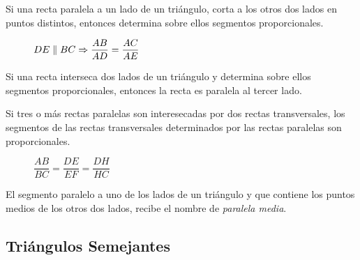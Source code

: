 
\begin{theorem}
    Si una recta paralela a un lado de un triángulo, corta a los otros dos lados en puntos distintos, entonces determina sobre ellos segmentos proporcionales.
    
    \begin{figure}[!h]
        \centering
        
        \caption{$DE \parallel BC \Rightarrow \dfrac{AB}{AD} = \dfrac{AC}{AE}$}
        \label{fig:theorem21}
    \end{figure}
\end{theorem}

\begin{theorem}
    Si una recta interseca dos lados de un triángulo y determina sobre ellos segmentos proporcionales, entonces la recta es paralela al tercer lado.    
\end{theorem}

\begin{theorem}
    Si tres o más rectas paralelas son interesecadas por dos rectas transversales, los segmentos de las rectas transversales determinados por las rectas paralelas son proporcionales.

    \begin{figure}[!h]
        \centering
        
        \caption{$\dfrac{AB}{BC} = \dfrac{DE}{EF} = \dfrac{DH}{HC}$}
        \label{fig:theorem22}
    \end{figure}    
\end{theorem}

\clearpage

\begin{definition}
    El segmento paralelo a uno de los lados de un triángulo y que contiene los puntos medios de los otros dos lados, recibe el nombre de \textit{paralela media}.

    \begin{figure}[!h]
        \centering
        
        \label{fig:paralela-media}
    \end{figure}    
    
\end{definition}

\subsection{Triángulos Semejantes}

